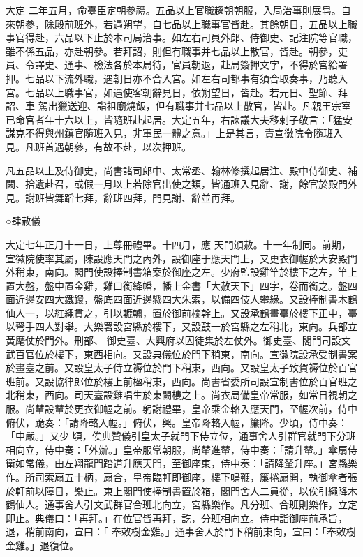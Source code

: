 \begin{pinyinscope}
 大定
 二年五月，命臺臣定朝參禮。五品以上官職趨朝朝服，入局治事則展皂。自來朝參，除殿前班外，若遇朔望，自七品以上職事官皆赴。其餘朝日，五品以上職事官得赴，六品以下止於本司局治事。如左右司員外郎、侍御史、記注院等官職，雖不係五品，亦赴朝參。若拜詔，則但有職事并七品以上散官，皆赴。朝參，吏員、令譯史、通事、檢法各於本局待，官員朝退，赴局簽押文字，不得於宮給署押。七品以下流外職，遇朝日亦不合入宮。如左右司都事有須合取奏事，乃聽入宮。七品以上職事官，如遇使客朝辭見日，依朔望日，皆赴。若元日、聖節、拜詔、車
 駕出獵送迎、詣祖廟燒飯，但有職事并七品以上散官，皆赴。凡親王宗室已命官者年十六以上，皆隨班赴起居。大定五年，右諫議大夫移剌子敬言：「猛安謀克不得與州鎮官隨班入見，非軍民一體之意。」上是其言，責宣徽院令隨班入見。凡班首遇朝參，有故不赴，以次押班。



 凡五品以上及侍御史，尚書諸司郎中、太常丞、翰林修撰起居注、殿中侍御史、補闕、拾遺赴召，或假一月以上若除官出使之類，皆通班入見辭、謝，餘官於殿門外見。謝班皆舞蹈七拜，辭班四拜，門見謝、辭並再拜。



 ○肆赦儀



 大定七年正月十一日，上尊冊禮畢。十四月，應
 天門頒赦。十一年制同。前期，宣徽院使率其屬，陳設應天門之內外，設御座于應天門上，又更衣御幄於大安殿門外稍東，南向。閣門使設捧制書箱案於御座之左。少府監設雞竿於樓下之左，竿上置大盤，盤中置金雞，雞口銜絳幡，幡上金書「大赦天下」四字，卷而銜之。盤四面近邊安四大鐵鐶，盤底四面近邊懸四大朱索，以備四伎人攀緣。又設捧制書木鶴仙人一，以紅繩貫之，引以轆轤，置於御前欄幹上。又設承鶴畫臺於樓下正中，臺以弩手四人對舉。大樂署設宮縣於樓下，又設鼓一於宮縣之左稍北，東向。兵部立黃麾仗於門外。刑部、
 御史臺、大興府以囚徒集於左仗外。御史臺、閣門司設文武百官位於樓下，東西相向。又設典儀位於門下稍東，南向。宣徽院設承受制書案於畫臺之前。又設皇太子侍立褥位於門下稍東，西向。又設皇太子致賀褥位於百官班前。又設協律郎位於樓上前楹稍東，西向。尚書省委所司設宣制書位於百官班之北稍東，西向。司天臺設雞唱生於東闕樓之上。尚衣局備皇帝常服，如常日視朝之服。尚輦設輦於更衣御幄之前。躬謝禮畢，皇帝乘金輅入應天門，至幄次前，侍中俯伏，跪奏：「請降輅入幄。」俯伏，興。皇帝降輅入幄，簾降。少頃，侍中奏：「中嚴。」又少
 頃，俟典贊儀引皇太子就門下侍立位，通事舍人引群官就門下分班相向立，侍中奏：「外辦。」皇帝服常朝服，尚輦進輦，侍中奏：「請升輦。」傘扇侍衛如常儀，由左翔龍門踏道升應天門，至御座東，侍中奏：「請降輦升座。」宮縣樂作。所司索扇五十柄，扇合，皇帝臨軒即御座，樓下鳴鞭，簾捲扇開，執御傘者張於軒前以障日，樂止。東上閣門使捧制書置於箱，閣門舍人二員從，以俟引繩降木鶴仙人。通事舍人引文武群官合班北向立，宮縣樂作。凡分班、合班則樂作，立定即止。典儀曰：「再拜。」在位官皆再拜，訖，分班相向立。侍中詣御座前承旨，退，稍前南向，宣曰：「
 奉敕樹金雞。」通事舍人於門下稍前東向，宣曰：「奉敕樹金雞。」退復位。




\end{pinyinscope}
